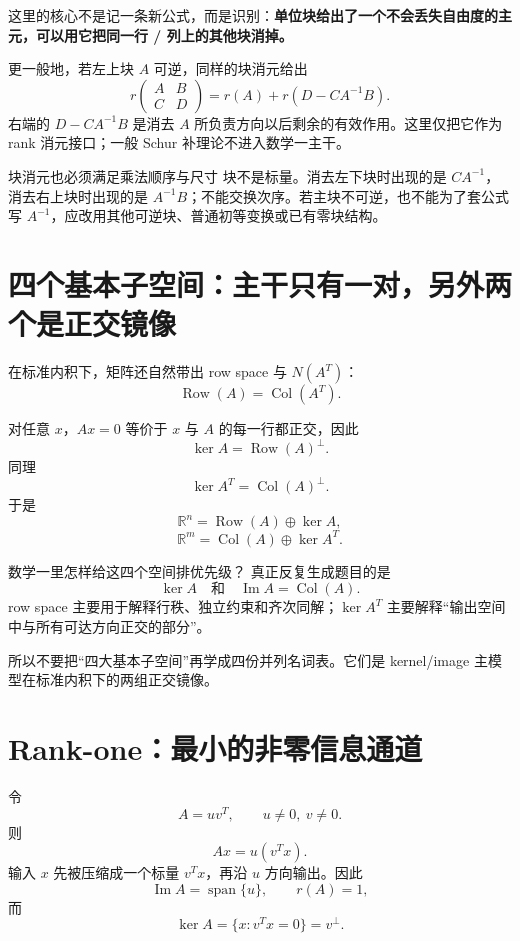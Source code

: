 \documentclass[11pt,a4paper]{ctexart}
\newcommand{\kw}[1]{\textbf{\color{deep}#1}}
\begin{document}
这里的核心不是记一条新公式，而是识别：\kw{单位块给出了一个不会丢失自由度的主元，可以用它把同一行 / 列上的其他块消掉。}

更一般地，若左上块 $A$ 可逆，同样的块消元给出
\[
\boxed{
r\begin{pmatrix}A&B\\C&D\end{pmatrix}
=r(A)+r(D-CA^{-1}B).}
\]
右端的 $D-CA^{-1}B$ 是消去 $A$ 所负责方向以后剩余的有效作用。这里仅把它作为 rank 消元接口；一般 Schur 补理论不进入数学一主干。

\begin{warnbox}{块消元也必须满足乘法顺序与尺寸}
块不是标量。消去左下块时出现的是 $CA^{-1}$，消去右上块时出现的是 $A^{-1}B$；不能交换次序。若主块不可逆，也不能为了套公式写 $A^{-1}$，应改用其他可逆块、普通初等变换或已有零块结构。
\end{warnbox}

\section{四个基本子空间：主干只有一对，另外两个是正交镜像}

在标准内积下，矩阵还自然带出 row space 与 $N(A^T)$：
\[
\operatorname{Row}(A)=\operatorname{Col}(A^T).
\]

对任意 $x$，$Ax=0$ 等价于 $x$ 与 $A$ 的每一行都正交，因此
\[
\boxed{\ker A=\operatorname{Row}(A)^\perp.}
\]
同理
\[
\boxed{\ker A^T=\operatorname{Col}(A)^\perp.}
\]
于是
\[
\mathbb R^n=\operatorname{Row}(A)\oplus\ker A,
\]
\[
\mathbb R^m=\operatorname{Col}(A)\oplus\ker A^T.
\]

\begin{methodbox}{数学一里怎样给这四个空间排优先级？}
真正反复生成题目的是
\[
\boxed{\ker A\quad\text{和}\quad\operatorname{Im}A=\operatorname{Col}(A).}
\]
row space 主要用于解释行秩、独立约束和齐次同解；$\ker A^T$ 主要解释“输出空间中与所有可达方向正交的部分”。

所以不要把“四大基本子空间”再学成四份并列名词表。它们是 kernel/image 主模型在标准内积下的两组正交镜像。
\end{methodbox}

\section{Rank-one：最小的非零信息通道}

令
\[
A=uv^T,
\qquad u\neq0,\ v\neq0.
\]
则
\[
Ax=u(v^Tx).
\]
输入 $x$ 先被压缩成一个标量 $v^Tx$，再沿 $u$ 方向输出。因此
\[
\operatorname{Im}A=\operatorname{span}\{u\},
\qquad r(A)=1,
\]
而
\[
\ker A=\{x:v^Tx=0\}=v^\perp.
\]
\end{document}
